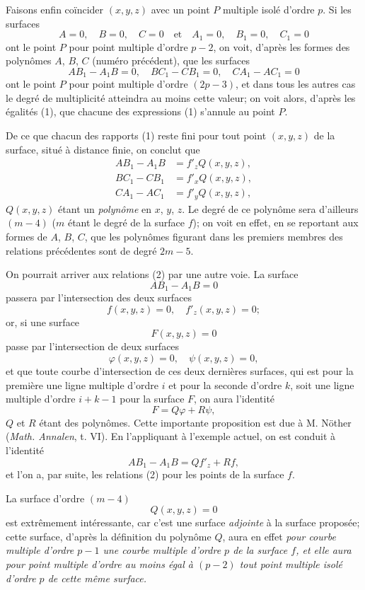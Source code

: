 \documentclass{article}
\begin{document}
Faisons enfin coïncider $(x, y, z)$ avec un point $P$ multiple isolé d'ordre $p$. Si les surfaces
\[
A = 0, \quad B = 0, \quad C = 0 \quad \text{et} \quad A_{1} = 0, \quad B_{1} = 0, \quad C_{1} = 0
\]
ont le point $P$ pour point multiple d'ordre $p - 2$, on voit, d'après les formes des polynômes $A$, $B$, $C$ (numéro précédent), que les surfaces
\[
AB_{1} - A_{1}B = 0, \quad BC_{1} - CB_{1} = 0, \quad CA_{1} - AC_{1} = 0
\]
ont le point $P$ pour point multiple d'ordre $(2p - 3)$, et dans tous les autres cas le degré de multiplicité atteindra au moins cette valeur; on voit alors, d'après les égalités (1), que chacune des expressions (1) s'annule au point $P$.

De ce que chacun des rapports (1) reste fini pour tout point $(x, y, z)$ de la surface, situé à distance finie, on conclut que
\[
\begin{aligned}
AB_{1} - A_{1}B &= f'_{z} Q(x, y, z), \\
BC_{1} - CB_{1} &= f'_{x} Q(x, y, z), \\
CA_{1} - AC_{1} &= f'_{y} Q(x, y, z),
\end{aligned}
\tag{2}
\]
$Q(x, y, z)$ étant un \emph{polynôme} en $x$, $y$, $z$. Le degré de ce polynôme sera d'ailleurs $(m - 4)$ ($m$ étant le degré de la surface $f$); on voit en effet, en se reportant aux formes de $A$, $B$, $C$, que les polynômes figurant
dans les premiers membres des relations précédentes sont de degré $2m - 5$.

On pourrait arriver aux relations (2) par une autre voie. La surface
\[
AB_{1} - A_{1}B = 0
\]
passera par l'intersection des deux surfaces
\[
f(x, y, z) = 0, \quad f'_{z}(x, y, z) = 0;
\]
or, si une surface
\[
F(x, y, z) = 0
\]
passe par l'intersection de deux surfaces
\[
\varphi(x, y, z) = 0, \quad \psi(x, y, z) = 0,
\]
et que toute courbe d'intersection de ces deux dernières surfaces, qui est pour la première une ligne multiple d'ordre $i$ et pour la seconde d'ordre $k$, soit une ligne multiple d'ordre $i + k - 1$ pour la surface $F$, on aura l'identité
\[
F = Q\varphi + R\psi,
\]
$Q$ et $R$ étant des polynômes. Cette importante proposition est due à M. Nöther (\emph{Math. Annalen}, t. VI). En l'appliquant à l'exemple actuel, on est conduit à l'identité
\[
AB_{1} - A_{1}B = Qf'_{z} + Rf,
\]
et l'on a, par suite, les relations (2) pour les points de la surface $f$.

La surface d'ordre $(m - 4)$
\[
Q(x, y, z) = 0
\]
est extrêmement intéressante, car c'est une surface \emph{adjointe} à la surface proposée; cette surface, d'après la définition du polynôme $Q$, aura en effet \emph{pour courbe multiple d'ordre $p - 1$ une courbe multiple d'ordre $p$ de la surface $f$, et elle aura pour point multiple d'ordre au moins égal à $(p - 2)$ tout point multiple isolé d'ordre $p$ de cette même surface.}
\end{document}
